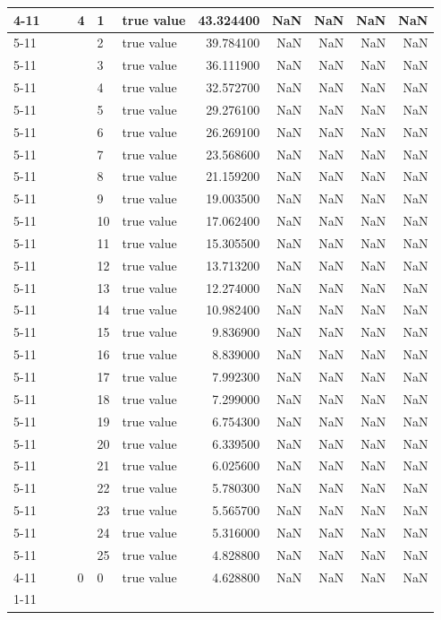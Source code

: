 \begin{tabular}{llllllrrrrr}
\cline{4-11} \cline{5-11}
 &  &  & \multirow[t]{25}{*}{4} & 1 & true value & 43.324400 & NaN & NaN & NaN & NaN \\
\cline{5-11}
 &  &  &  & 2 & true value & 39.784100 & NaN & NaN & NaN & NaN \\
\cline{5-11}
 &  &  &  & 3 & true value & 36.111900 & NaN & NaN & NaN & NaN \\
\cline{5-11}
 &  &  &  & 4 & true value & 32.572700 & NaN & NaN & NaN & NaN \\
\cline{5-11}
 &  &  &  & 5 & true value & 29.276100 & NaN & NaN & NaN & NaN \\
\cline{5-11}
 &  &  &  & 6 & true value & 26.269100 & NaN & NaN & NaN & NaN \\
\cline{5-11}
 &  &  &  & 7 & true value & 23.568600 & NaN & NaN & NaN & NaN \\
\cline{5-11}
 &  &  &  & 8 & true value & 21.159200 & NaN & NaN & NaN & NaN \\
\cline{5-11}
 &  &  &  & 9 & true value & 19.003500 & NaN & NaN & NaN & NaN \\
\cline{5-11}
 &  &  &  & 10 & true value & 17.062400 & NaN & NaN & NaN & NaN \\
\cline{5-11}
 &  &  &  & 11 & true value & 15.305500 & NaN & NaN & NaN & NaN \\
\cline{5-11}
 &  &  &  & 12 & true value & 13.713200 & NaN & NaN & NaN & NaN \\
\cline{5-11}
 &  &  &  & 13 & true value & 12.274000 & NaN & NaN & NaN & NaN \\
\cline{5-11}
 &  &  &  & 14 & true value & 10.982400 & NaN & NaN & NaN & NaN \\
\cline{5-11}
 &  &  &  & 15 & true value & 9.836900 & NaN & NaN & NaN & NaN \\
\cline{5-11}
 &  &  &  & 16 & true value & 8.839000 & NaN & NaN & NaN & NaN \\
\cline{5-11}
 &  &  &  & 17 & true value & 7.992300 & NaN & NaN & NaN & NaN \\
\cline{5-11}
 &  &  &  & 18 & true value & 7.299000 & NaN & NaN & NaN & NaN \\
\cline{5-11}
 &  &  &  & 19 & true value & 6.754300 & NaN & NaN & NaN & NaN \\
\cline{5-11}
 &  &  &  & 20 & true value & 6.339500 & NaN & NaN & NaN & NaN \\
\cline{5-11}
 &  &  &  & 21 & true value & 6.025600 & NaN & NaN & NaN & NaN \\
\cline{5-11}
 &  &  &  & 22 & true value & 5.780300 & NaN & NaN & NaN & NaN \\
\cline{5-11}
 &  &  &  & 23 & true value & 5.565700 & NaN & NaN & NaN & NaN \\
\cline{5-11}
 &  &  &  & 24 & true value & 5.316000 & NaN & NaN & NaN & NaN \\
\cline{5-11}
 &  &  &  & 25 & true value & 4.828800 & NaN & NaN & NaN & NaN \\
\cline{4-11} \cline{5-11}
 &  &  & 0 & 0 & true value & 4.628800 & NaN & NaN & NaN & NaN \\
\cline{1-11} \cline{2-11} \cline{3-11} \cline{4-11} \cline{5-11}
\bottomrule
\end{tabular}
